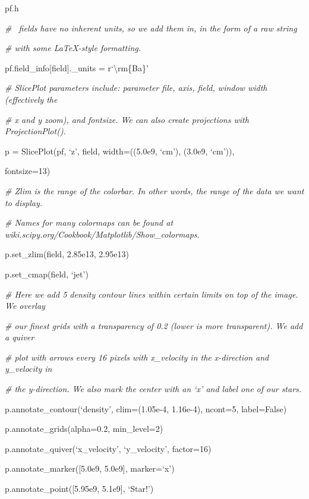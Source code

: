 pf.h

{\it\# \amrex\ fields have no inherent units, so we add them in,
  in the form of a raw string} 

{\setlength{\parskip}{0pt}

{\it\# with some LaTeX-style formatting.}

pf.field\_info[field].\_units = r`\textbackslash rm\{Ba\}'
}


{\it\# SlicePlot parameters include: parameter file, axis, field, window width (effectively the}
{\setlength{\parskip}{0pt}

{\it\# x and y zoom), and fontsize. We can also create projections with ProjectionPlot().}

p = SlicePlot(pf, `z', field, width=((5.0e9, `cm'), (3.0e9, `cm')),

{\setlength{\parindent}{68pt}fontsize=13)}
}

{\it\# Zlim is the range of the colorbar. In other words, the range of the data we want to display.}
{\setlength{\parskip}{0pt}

{\it\# Names for many colormaps can be found at wiki.scipy.org/Cookbook/Matplotlib/Show\_colormaps.}

p.set\_zlim(field, 2.85e13, 2.95e13)
}

p.set\_cmap(field, `jet')

{\it\# Here we add 5 density contour lines within certain limits on top of the image. We overlay}
{\setlength{\parskip}{0pt}

{\it\# our finest grids with a transparency of 0.2 (lower is more transparent). We add a quiver}

{\it\# plot with arrows every 16 pixels with x\_velocity in the x-direction and y\_velocity in}

{\it\# the y-direction. We also mark the center with an `x' and label one of our stars.}

p.annotate\_contour(`density', clim=(1.05e-4, 1.16e-4), ncont=5, label=False)
}

p.annotate\_grids(alpha=0.2, min\_level=2)

p.annotate\_quiver(`x\_velocity', `y\_velocity', factor=16)

p.annotate\_marker([5.0e9, 5.0e9], marker=`x')

p.annotate\_point([5.95e9, 5.1e9], `Star!')

